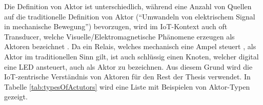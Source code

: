\begin{table}[H]
\centering
{}
\caption{Typen von Aktoren}
\label{tab:typesOfActutors}
\end{table}

Die Definition von Aktor ist unterschiedlich, während eine Anzahl von Quellen auf die traditionelle Definition von Aktor ("`Umwandeln von elektrischem Signal in mechanische Bewegung"') bevorzugen, wird im \ac{IoT}-Kontext auch oft Transducer, welche Visuelle/Elektromagnetische Phänomene erzeugen als Aktoren bezeichnet \cite{Dunko2006reference}. Da ein Relais, welches mechanisch eine Ampel steuert \cite{salarian2012coordination}, als Aktor im traditionellen Sinn gilt, ist auch schlüssig einen Knoten, welcher digital eine LED ansteuert, auch als Aktor zu bezeichnen. Aus diesem Grund wird die \ac{IoT}-zentrische Verständnis von Aktoren für den Rest der Thesis verwendet. In Tabelle \ref{tab:typesOfActutors} wird eine Liste mit Beispielen von Aktor-Typen gezeigt. 

